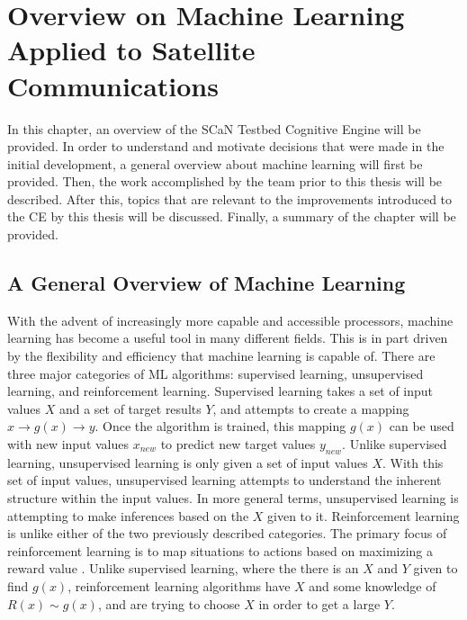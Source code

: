 
%	
	\chapter{Overview on Machine Learning Applied to Satellite Communications}
		\par In this chapter, an overview of the SCaN Testbed Cognitive Engine will be provided. In order to understand and motivate decisions that were made in the initial development, a general overview about machine learning will first be provided. Then, the work accomplished by the team prior to this thesis will be described. After this, topics that are relevant to the improvements introduced to the CE by this thesis will be discussed. Finally, a summary of the chapter will be provided.
	\section{A General Overview of Machine Learning}\label{bg:introToML}
	\par With the advent of increasingly more capable and accessible processors, machine learning has become a useful tool in many different fields. This is in part driven by the flexibility and efficiency that machine learning is capable of. There are three major categories of ML algorithms\cite{introToML}: supervised learning, unsupervised learning, and reinforcement learning. Supervised learning takes a set of input values $X$ and a set of target results $Y$, and attempts to create a mapping $x \to g(x)\to y$. Once the algorithm is trained, this mapping $g(x)$ can be used with new input values $x_{new}$ to predict new target values $y_{new}$. Unlike supervised learning, unsupervised learning is only given a set of input values $X$. With this set of input values, unsupervised learning attempts to understand the inherent structure within the input values. In more general terms, unsupervised learning is attempting to make inferences based on the $X$ given to it. Reinforcement learning is unlike either of the two previously described categories. The primary focus of reinforcement learning is to map situations to actions based on maximizing a reward value \cite{rl_intro}. Unlike supervised learning, where the there is an $X$ and $Y$ given to find $g(x)$, reinforcement learning algorithms have $X$ and some knowledge of $R(x)\sim g(x)$, and are trying to choose $X$ in order to get a large $Y$. 
	
